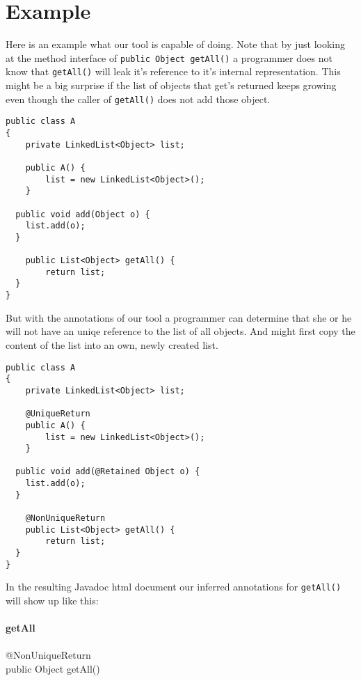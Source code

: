 \section{Example}

Here is an example what our tool is capable of doing.
Note that by just looking at the method interface of 
\texttt{public Object getAll()} a programmer does not know
that \texttt{getAll()} will leak it's reference to it's
internal representation. This might be a big surprise
if the list of objects that get's returned keeps growing
even though the caller of \texttt{getAll()} does not add those object.


\begin{lstlisting}
public class A
{
	private LinkedList<Object> list;
		
	public A() {
		list = new LinkedList<Object>();
	}
		
  public void add(Object o) {
   	list.add(o);
  }
    
	public List<Object> getAll() {
		return list;
  }
}
\end{lstlisting}

But with the annotations of our tool a programmer can 
determine that she or he will not have an uniqe reference
to the list of all objects. And might first copy the content 
of the list into an own, newly created list.

\begin{lstlisting}
public class A
{
	private LinkedList<Object> list;
	
	@UniqueReturn
	public A() {
		list = new LinkedList<Object>();
	}
		
  public void add(@Retained Object o) {
   	list.add(o);
  }
  
	@NonUniqueReturn
	public List<Object> getAll() {
		return list;
  }
}
\end{lstlisting}

In the resulting Javadoc html document our inferred annotations
for \texttt{getAll()} will show up like this:\\
\\
{\bf getAll}\\
\\
@NonUniqueReturn\\
public Object getAll()\\